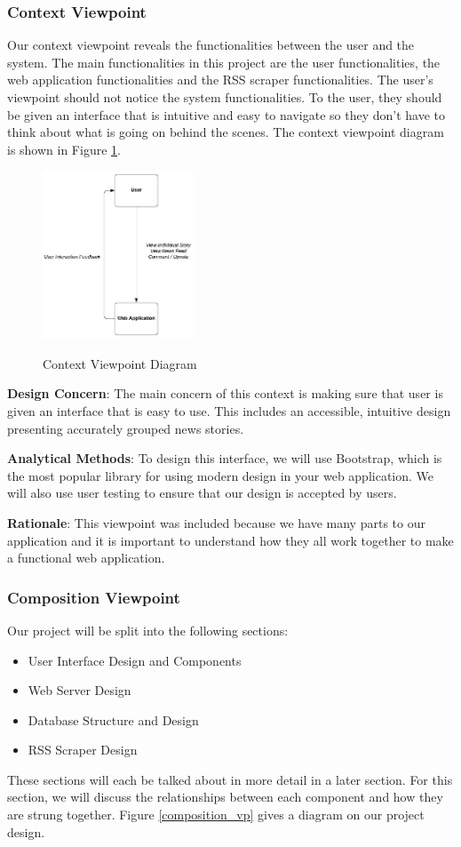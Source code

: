 \documentclass[onecolumn, draftclsnofoot,10pt, compsoc]{IEEEtran}
\begin{document}
\subsubsection{Context Viewpoint}
Our context viewpoint reveals the functionalities between the user and the system. The main functionalities in this project are the user functionalities, the web application functionalities and the RSS scraper functionalities. The user's viewpoint should not notice the system functionalities. To the user, they should be given an interface that is intuitive and easy to navigate so they don't have to think about what is going on behind the scenes. The context viewpoint diagram is shown in Figure \ref{context_vp}.
\begin{figure}[!ht]
    \centering
    \caption{Context Viewpoint Diagram}
    \includegraphics[width=0.4\textwidth]{context_vp.eps}
    \label{context_vp}
\end{figure}

\hangindent=0.5cm \textbf{Design Concern}: The main concern of this context is making sure that user is given an interface that is easy to use. This includes an accessible, intuitive design presenting accurately grouped news stories.

\hangindent=0.5cm \textbf{Analytical Methods}: To design this interface, we will use Bootstrap, which is the most popular library for using modern design in your web application. We will also use user testing to ensure that our design is accepted by users. 

\hangindent=0.5cm \textbf{Rationale}: This viewpoint was included because we have many parts to our application and it is important to understand how they all work together to make a functional web application.

\subsubsection{Composition Viewpoint}
Our project will be split into the following sections:
\begin{itemize}
    \item User Interface Design and Components
    \item Web Server Design
    \item Database Structure and Design
    \item RSS Scraper Design
\end{itemize}
These sections will each be talked about in more detail in a later section. For this section, we will discuss the relationships between each component and how they are strung together. Figure \ref{composition_vp} gives a diagram on our project design.
\end{document}
